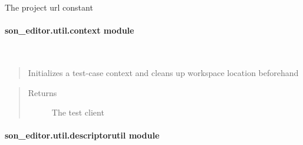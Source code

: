 \documentclass[letterpaper,10pt,english]{sphinxmanual}
\begin{document}
\begin{fulllineitems}
\label{_source/son_editor.util:son_editor.util.constants.WORKSPACES}
The project url constant

\end{fulllineitems}



\paragraph{son\_editor.util.context module}
\label{_source/son_editor.util:son-editor-util-context-module}\label{_source/son_editor.util:module-son_editor.util.context}

\begin{fulllineitems}
\label{_source/son_editor.util:son_editor.util.context.init_test_context}~\begin{quote}

Initializes a test-case context and cleans up workspace location beforehand
\end{quote}
\begin{quote}\begin{description}
\item[{Returns}] \leavevmode
The test client

\end{description}\end{quote}

\end{fulllineitems}



\paragraph{son\_editor.util.descriptorutil module}
\label{_source/son_editor.util:module-son_editor.util.descriptorutil}\label{_source/son_editor.util:son-editor-util-descriptorutil-module}
\end{document}
